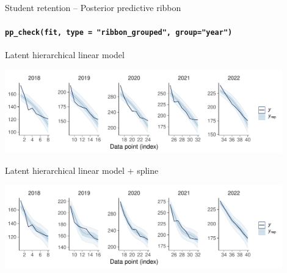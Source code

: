 \documentclass[t]{beamer}
\begin{document}
\begin{frame}[fragile]{Student retention -- Posterior predictive ribbon}
\framesubtitle{\texttt{pp\_check(fit, type = "ribbon\_grouped", group="year")}}

\vspace{-0.8\baselineskip}  
Latent hierarchical linear model\\  
  \hspace{-7mm}
  \begin{minipage}[t][3.6cm][t]{1.0\linewidth}
    \includegraphics[height=3.6cm]{student_retention_lbinom_ppc_ribbon_grouped.pdf}
  \end{minipage}
  
\vspace{-0.5\baselineskip}  
Latent hierarchical linear model + spline\\  
  \hspace{-7mm}
  \begin{minipage}[t][3.6cm][t]{1.0\linewidth}
    \includegraphics[height=3.6cm]{student_retention_sbinom_ppc_ribbon_grouped.pdf}
  \end{minipage}  

\end{frame}


  
\end{document}
